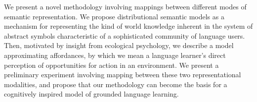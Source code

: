We present a novel methodology involving mappings between different modes of semantic representation.  We propose distributional semantic models as a mechanism for representing the kind of world knowledge inherent in the system of abstract symbols characteristic of a sophisticated community of language users.  Then, motivated by insight from ecological psychology, we describe a model approximating affordances, by which we mean a language learner's direct perception of opportunities for action in an environment.  We present a preliminary experiment involving mapping between these two representational modalities, and propose that our methodology can become the basis for a cognitively inspired model of grounded language learning.
